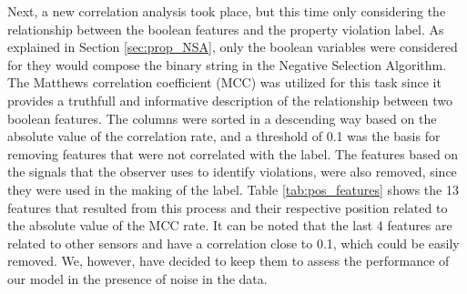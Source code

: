 Next, a new correlation analysis took place, but this time only considering the relationship between the boolean features and the property violation label. As explained in Section \ref{sec:prop_NSA}, only the boolean variables were considered for they would compose the binary string in the Negative Selection Algorithm. The Matthews correlation coefficient (MCC) was utilized for this task \cite{chicco2020advantages} since it provides a truthfull and informative description of the relationship between two boolean features. The columns were sorted in a descending way based on the absolute value of the correlation rate, and a threshold of 0.1 was the basis for removing features that were not correlated with the label. The features based on the signals that the observer uses to identify violations, were also removed, since they were used in the making of the label. Table \ref{tab:pos_features} shows the 13 features that resulted from this process and their respective position related to the absolute value of the MCC rate. It can be noted that the last 4 features are related to other sensors and have a correlation close to 0.1, which could be easily removed. We, however, have decided to keep them to assess the performance of our model in the presence of noise in the data.


